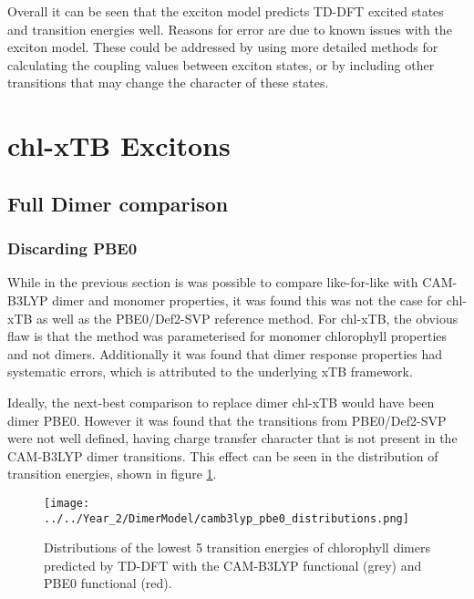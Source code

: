 Overall it can be seen that the exciton model predicts TD-DFT excited states and
transition energies well. Reasons for error are due to known issues with the exciton
model. These could be addressed by using more detailed methods for calculating the
coupling values between exciton states, or by including other transitions that may
change the character of these states.

\afterpartskip
\section{chl-xTB Excitons}
\label{sec:chl_xTB_excitons}

\subsection{Full Dimer comparison}
\label{subsec:pbe0_and_chl_xtb_dimer}

\subsubsection{Discarding PBE0}
\label{subsec:state_assign}

While in the previous section is was possible to compare like-for-like with CAM-B3LYP
dimer and monomer properties, it was found this was not the case for chl-xTB as 
well as the PBE0/Def2-SVP reference method. For chl-xTB, the obvious flaw is that
the method was parameterised for monomer chlorophyll properties and not dimers.
Additionally it was found that dimer response properties had systematic errors, 
which is attributed to the underlying xTB framework.

Ideally, the next-best comparison to replace dimer chl-xTB would have been dimer
PBE0. However it was found that the transitions from PBE0/Def2-SVP were not well
defined, having charge transfer character that is not present in the CAM-B3LYP
dimer transitions. This effect can be seen in the distribution of transition energies, 
shown in figure \ref{fig:camb3lyp_pbe0_distributions}.

\begin{figure}
    \centering
    \texttt{[image: ../../Year\_2/DimerModel/camb3lyp\_pbe0\_distributions.png]}
    \label{fig:camb3lyp_pbe0_distributions}
    \caption{Distributions of the lowest 5 transition energies of chlorophyll dimers 
    predicted by TD-DFT with the CAM-B3LYP functional (grey) and PBE0 functional (red).}
\end{figure}

